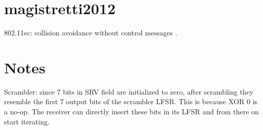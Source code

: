 
\section*{magistretti2012}

802.11ec: collision avoidance without control messages \cite{magistretti2012}.\\






\section*{Notes}

Scrambler: since 7 bits in SRV field are initialized to zero, after scrambling they resemble the first 7 output bits of the scrambler LFSR. This is because XOR 0 is a no-op. The receiver can directly insert these bits in its LFSR and from there on start iterating.
